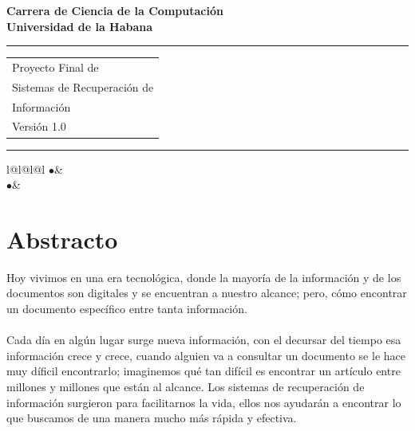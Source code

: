 \documentclass{llncs}
\begin{document}
\thispagestyle{empty}
\begin{flushleft}
\LARGE\bfseries Carrera de Ciencia de la Computaci\'on\\
Universidad de la Habana\\[2cm]
\end{flushleft}
\rule{\textwidth}{1pt}
\vspace{2pt}
\begin{flushright}
\Huge
\begin{tabular}{@{}l}
Proyecto Final de\\
Sistemas de Recuperaci\'on de\\
Informaci\'on\\
{\Large Versi\'on 1.0}
\end{tabular}
\end{flushright}
\rule{\textwidth}{1pt}
\vfill

\begin{flushleft}
\begin{tabular}{l@{\quad}l@{\hspace{3mm}}l@{\qquad}l}
$\bullet$&\\[1mm]
$\bullet$&\\[1mm]
\end{tabular}
\end{flushleft}


%
\newpage
\tableofcontents
\newpage

%
\section{Abstracto}
%

Hoy vivimos en una era tecnol\'ogica, donde la mayor\'ia de la informaci\'on y de los documentos son digitales y se encuentran a nuestro alcance; pero, c\'omo encontrar un documento espec\'ifico entre tanta informaci\'on.
\\\\
Cada d\'ia en alg\'un lugar surge nueva informaci\'on, con el decursar del tiempo esa informaci\'on crece y crece, cuando alguien va a consultar un documento se le hace muy d\'ificil encontrarlo; imaginemos qu\'e tan dif\'icil es encontrar un art\'iculo entre millones y millones que est\'an al alcance. Los sistemas de recuperaci\'on de informaci\'on surgieron para facilitarnos la vida, ellos nos ayudar\'an a encontrar lo que buscamos de una manera mucho m\'as r\'apida y efectiva.
\end{document}
